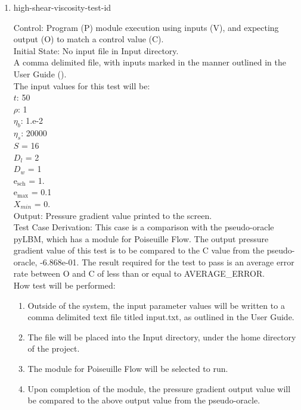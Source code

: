 \documentclass[12pt, titlepage]{article}
\newcounter{testcounter} %
\begin{document}
\begin{enumerate}
\item{high-shear-viscosity-test-id\thetestcounter \\}

Control: Program (P) module execution using inputs (V), and expecting output (O) to match a control value (C).\\
					
Initial State: No input file in Input directory.\\
					
A comma delimited file, with inputs marked in the manner outlined in the User Guide (\citet{LBM_UserGuide_PM}).\\The input values for this test will be:\\
$t$: 50\\
$\rho$: 1\\
$\eta_b$: 1.e-2\\
$\eta_s$: 20000\\
$S$ = 16\\
$D_{l}$ = 2\\
$D_{w}$ = 1\\
$\mathrm{e_{sch}}$ = 1.\\
$\mathrm{e_{max}}$ = 0.1\\
$X_{min}$ = 0.\\

					
Output: Pressure gradient value printed to the screen. \\ 

Test Case Derivation: This case is a comparison with the pseudo-oracle pyLBM, which has a module for Poiseuille Flow. The output pressure gradient value of this test is to be compared to the C value from the pseudo-oracle, -6.868e-01. The result required for the test to pass is an average error rate between O and C of less than or equal to AVERAGE\_ERROR.\\

					
How test will be performed: 

\begin{enumerate}
\item Outside of the system, the input parameter values will be written to a comma delimited text file titled input.txt, as outlined in the User Guide.
\item The file will be placed into the Input directory, under the home directory of the project.
\item The module for Poiseuille Flow will be selected to run.
\item Upon completion of the module, the pressure gradient output value will be compared to the above output value from the pseudo-oracle.
\end{enumerate}	

\end{enumerate}
\end{document}

